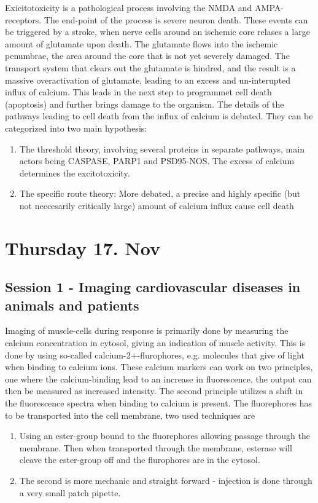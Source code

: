 \documentclass[12p]{article}
\begin{document}
Exicitotoxicity is a pathological process involving the NMDA and AMPA-receptors.
The end-point of the process is severe neuron death.
These events can be triggered by a stroke, when nerve cells around an ischemic core relases a large amount of glutamate upon death.
The glutamate flows into the ischemic penumbrae, the area around the core that is not yet severely damaged.
The transport system that clears out the glutamate is hindred, and the result is a massive overactivation of glutamate, leading to an excess and un-interupted influx of calcium.
This leads in the next step to programmet cell death (apoptosis) and further brings damage to the organism.
The details of the pathways leading to cell death from the influx of calcium is debated.
They can be categorized into two main hypothesis:

\begin{enumerate}
\item
The threshold theory, involving several proteins in separate pathways, main actors being CASPASE, PARP1 and PSD95-NOS. The excess of calcium determines the excitotoxicity.
\item
The specific route theory: More debated, a precise and highly specific (but not neccesarily critically large) amount of calcium influx cause cell death
\end{enumerate}

\section*{Thursday 17. Nov}

\subsection*{Session 1 - Imaging cardiovascular diseases in animals and patients}

Imaging of muscle-cells during response is primarily done by measuring the calcium concentration in cytosol, giving an indication of muscle activity.
This is done by using so-called calcium-2+-flurophores, e.g. molecules that give of light when binding to calcium ions.
These calcium markers can work on two principles, one where the calcium-binding lead to an increase in fluorescence, the output can then be measured as increased intensity.
The second principle utilizes a shift in the fluorescence spectra when binding to calcium is present.
The fluorephores has to be transported into the cell membrane, two used techniques are 

\begin{enumerate}
\item
Using an ester-group bound to the fluorephores allowing passage through the membrane.
Then when transported through the membrane, esterase will cleave the ester-group off and the flurophores are in the cytosol.
\item
The second is more mechanic and straight forward - injection is done through a very small patch pipette.
\end{enumerate}
\end{document}
